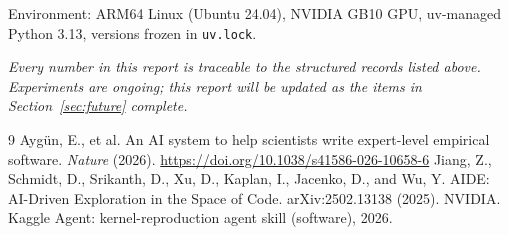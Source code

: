 \documentclass[11pt,a4paper]{article}
\begin{document}
Environment: ARM64 Linux (Ubuntu 24.04), NVIDIA GB10 GPU, uv-managed Python 3.13, versions frozen in \texttt{uv.lock}.

\vspace{1em}
\noindent\emph{Every number in this report is traceable to the structured records listed above. Experiments are ongoing; this report will be updated as the items in Section~\ref{sec:future} complete.}


\begin{thebibliography}{9}
 Ayg\"un, E., et al. An AI system to help scientists write expert-level empirical software. \emph{Nature} (2026). \url{https://doi.org/10.1038/s41586-026-10658-6}
 Jiang, Z., Schmidt, D., Srikanth, D., Xu, D., Kaplan, I., Jacenko, D., and Wu, Y. AIDE: AI-Driven Exploration in the Space of Code. arXiv:2502.13138 (2025).
 NVIDIA. Kaggle Agent: kernel-reproduction agent skill (software), 2026.
\end{thebibliography}
\end{document}
